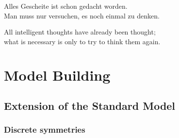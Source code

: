 \begin{savequote}[8cm]
Alles Gescheite ist schon gedacht worden.\\
Man muss nur versuchen, es noch einmal zu denken.

All intelligent thoughts have already been thought;\\
what is necessary is only to try to think them again.
\end{savequote}

\chapter{\label{ch:2-litreview}Model Building}

\minitoc

\section{Extension of the Standard Model}









\subsection{Discrete symmetries}





